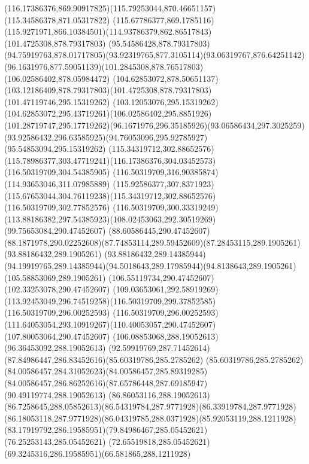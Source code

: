{{	\curveto(116.17386376,869.90917825)(115.79253044,870.46651157)(115.34586378,871.05317822)
	\curveto(115.67786377,869.1785116)(115.9271971,866.10384501)(114.93786379,862.86517843)
	\moveto(101.4725308,878.79317803)
	\lineto(95.54586428,878.79317803)
	\curveto(94.75919763,878.01717805)(93.92319765,877.3105114)(93.06319767,876.64251142)
	\curveto(96.1631976,877.59051139)(101.2845308,878.76517803)(106.02586402,878.05984472)
	\curveto(104.62853072,878.50651137)(103.12186409,878.79317803)(101.4725308,878.79317803)
	\moveto(101.47119746,295.15319262)
	\curveto(103.12053076,295.15319262)(104.62853072,295.43719261)(106.02586402,295.8851926)
	\curveto(101.28719747,295.17719262)(96.1671976,296.35185926)(93.06586434,297.3025259)
	\curveto(93.92586432,296.63585925)(94.76053096,295.92785927)(95.54853094,295.15319262)
	\closepath
	\moveto(115.34319712,302.88652576)
	\curveto(115.78986377,303.47719241)(116.17386376,304.03452573)(116.50319709,304.54385905)
	\lineto(116.50319709,316.90385874)
	\lineto(114.93653046,311.07985889)
	\curveto(115.92586377,307.8371923)(115.67653044,304.76119238)(115.34319712,302.88652576)
	\moveto(116.50319709,302.77852576)
	\lineto(116.50319709,300.33319249)
	\curveto(113.88186382,297.54385923)(108.02453063,292.30519269)(99.75653084,290.47452607)
	\lineto(88.60586445,290.47452607)
	\curveto(88.1871978,290.02252608)(87.74853114,289.59452609)(87.28453115,289.1905261)
	\lineto(93.88186432,289.1905261)
	\lineto(93.88186432,289.14385944)
	\curveto(94.19919765,289.14385944)(94.5018643,289.17985944)(94.8138643,289.1905261)
	\lineto(105.58853069,289.1905261)
	\lineto(106.55119734,290.47452607)
	\lineto(102.33253078,290.47452607)
	\curveto(109.03653061,292.58919269)(113.92453049,296.74519258)(116.50319709,299.37852585)
	\lineto(116.50319709,296.00252593)
	\curveto(116.50319709,296.00252593)(111.64053054,293.10919267)(110.40053057,290.47452607)
	\lineto(107.80053064,290.47452607)
	\lineto(106.08853068,288.19052613)
	\lineto(96.36453092,288.19052613)
	\curveto(92.59919769,287.71452614)(87.84986447,286.83452616)(85.60319786,285.2785262)
	\curveto(85.60319786,285.2785262)(84.00586457,284.31052623)(84.00586457,285.89319285)
	\curveto(84.00586457,286.86252616)(87.65786448,287.69185947)(90.49119774,288.19052613)
	\lineto(86.86053116,288.19052613)
	\curveto(86.7258645,288.05852613)(86.54319784,287.9771928)(86.33919784,287.9771928)
	\curveto(86.18053118,287.9771928)(86.04319785,288.0371928)(85.92053119,288.1211928)
	\curveto(83.17919792,286.19585951)(79.84986467,285.05452621)(76.25253143,285.05452621)
	\curveto(72.65519818,285.05452621)(69.3245316,286.19585951)(66.581865,288.1211928)
}}
